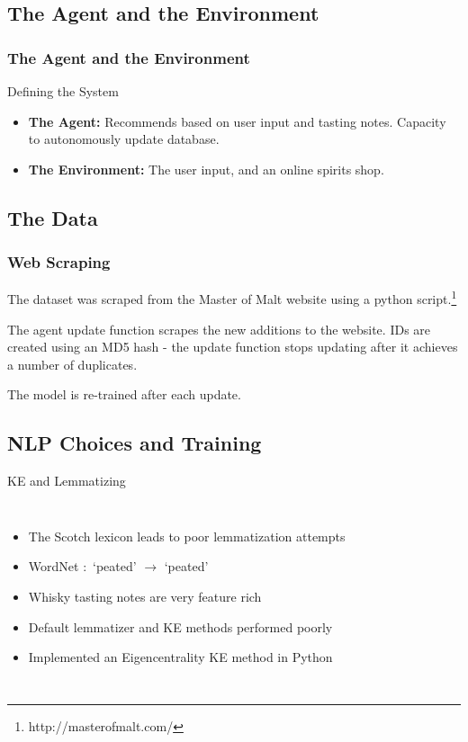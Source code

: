 \documentclass{beamer}
\begin{document}
\subsection{The Agent and the Environment}
\begin{frame}
    \frametitle{The Agent and the Environment}
    \begin{block}{Defining the System}
    \begin{itemize}
        \item \textbf{The Agent:} Recommends based on user input and 
        tasting notes. Capacity to autonomously update database.
        \item \textbf{The Environment:} The user input, and an online spirits
        shop.
    \end{itemize}
\end{block}
\end{frame}

\subsection{The Data}
\begin{frame}
    \frametitle{Web Scraping}
    The dataset was scraped from the Master of Malt website using a python 
script.\footnote{http://masterofmalt.com/}

The agent update function scrapes the new additions to the website. 
IDs are created using an MD5 hash - the update function stops updating 
after it achieves a number of duplicates.

The model is re-trained after each update.
\end{frame}

\subsection{NLP Choices and Training}
\begin{frame}{KE and Lemmatizing}
\begin{columns}[c] %
\begin{itemize}
    \item The Scotch lexicon leads to poor lemmatization attempts
    \item WordNet $:$ `peated' $\rightarrow$ `peated'
    \item Whisky tasting notes are very feature rich
    \item Default lemmatizer and KE methods performed poorly
    \item Implemented an Eigencentrality KE method in Python
\end{itemize}
        

\end{columns}
\end{frame}
\end{document}
